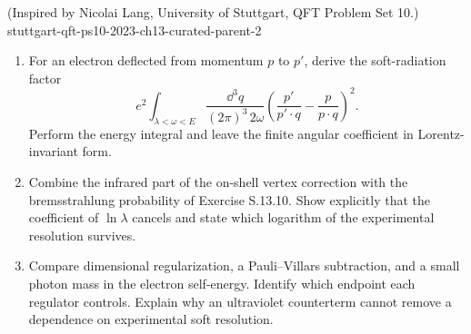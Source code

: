 \begin{enumerate}
  {(Inspired by Nicolai Lang, University of Stuttgart, QFT Problem Set 10.)}
  {stuttgart-qft-ps10-2023-ch13-curated-parent-2}
\begin{enumerate}
\item
For an electron deflected from momentum \(p\) to \(p'\), derive the
soft-radiation factor
\[
 e^2\int_{\lambda<\omega<E}\frac{\dd^3q}{(2\pi)^3\,2\omega}
 \left(\frac{p'}{p'\cdot q}-\frac{p}{p\cdot q}\right)^2 .
\]
Perform the energy integral and leave the finite angular coefficient in
Lorentz-invariant form.
\item
Combine the infrared part of the on-shell vertex correction with the
bremsstrahlung probability of Exercise S.13.10.  Show explicitly that the
coefficient of \(\ln\lambda\) cancels and state which logarithm of the
experimental resolution survives.
\item
Compare dimensional regularization, a Pauli--Villars subtraction, and a
small photon mass in the electron self-energy.  Identify which endpoint
each regulator controls.  Explain why an ultraviolet counterterm cannot
remove a dependence on experimental soft resolution.
\end{enumerate}


\end{enumerate}
